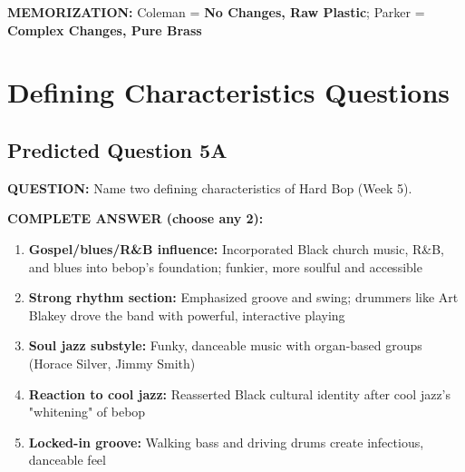 \documentclass[11pt]{article}
\begin{document}
\textbf{MEMORIZATION:} Coleman = \textbf{\textcolor{freejazz}{No Changes, Raw Plastic}}; Parker = \textbf{Complex Changes, Pure Brass}

\newpage

\section{Defining Characteristics Questions}

\subsection*{Predicted Question 5A}

\begin{mdframed}[backgroundcolor=questioncolor!10, linewidth=2pt]
\textbf{\textcolor{questioncolor}{QUESTION:}} Name two defining characteristics of Hard Bop (Week 5).
\end{mdframed}

\begin{mdframed}[backgroundcolor=answercolor!10, linewidth=2pt]
\textbf{\textcolor{answercolor}{COMPLETE ANSWER (choose any 2):}}

\begin{enumerate}[leftmargin=*, nosep]
    \item \textbf{Gospel/blues/R\&B influence:} Incorporated Black church music, R\&B, and blues into bebop's foundation; funkier, more soulful and accessible
    
    \item \textbf{Strong rhythm section:} Emphasized groove and swing; drummers like Art Blakey drove the band with powerful, interactive playing
    
    \item \textbf{Soul jazz substyle:} Funky, danceable music with organ-based groups (Horace Silver, Jimmy Smith)
    
    \item \textbf{Reaction to cool jazz:} Reasserted Black cultural identity after cool jazz's "whitening" of bebop
    
    \item \textbf{Locked-in groove:} Walking bass and driving drums create infectious, danceable feel
\end{enumerate}

\vspace{5pt}
\end{mdframed}
\end{document}
